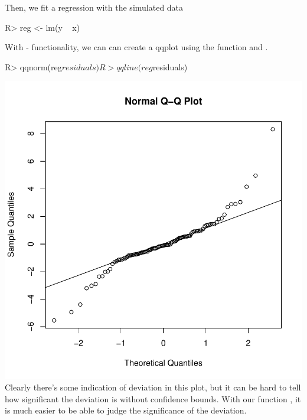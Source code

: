 \documentclass[article]{jss}
\begin{document}
%
Then, we fit a regression with the simulated data
%
\begin{Schunk}
\begin{Sinput}
R> reg <- lm(y ~ x)
\end{Sinput}
\end{Schunk}
%
With - functionality, we can can create a qqplot using the function  and . 
%
%
\begin{Schunk}
\begin{Sinput}
R> qqnorm(reg$residuals)
R> qqline(reg$residuals)
\end{Sinput}
\end{Schunk}
\includegraphics{manuscript-base_qqplot}
%
%
\newline
Clearly there's some indication of deviation in this plot, but it can be hard to tell how significant the deviation is without confidence bounds. With our function , it is much easier to be able to judge the significance of the deviation.
%
%
\begin{Schunk}
\end{Schunk}
\end{document}
